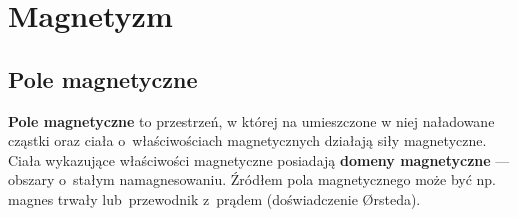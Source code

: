 \chapter{Magnetyzm}

\section{Pole magnetyczne}
\begin{definition}
  \textbf{Pole magnetyczne} to przestrzeń, w której na umieszczone w niej naładowane cząstki oraz
  ciała o~właściwościach magnetycznych działają siły magnetyczne. Ciała wykazujące właściwości
  magnetyczne posiadają \textbf{domeny magnetyczne} --- obszary o~stałym namagnesowaniu. Źródłem
  pola magnetycznego może być np. magnes trwały lub~przewodnik z~prądem (doświadczenie Ørsteda).
\end{definition}


